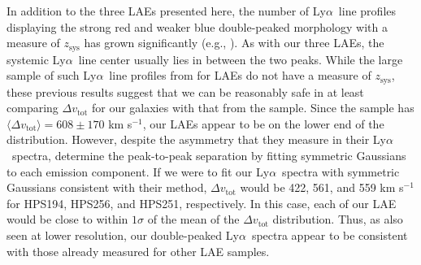 \documentclass{emulateapj}
\newcommand{\lya}{Ly$\alpha$}
\begin{document}
In addition to the three LAEs presented here, the number of \lya\ line profiles displaying the strong red and weaker blue double-peaked morphology with a measure of $z_{\mathrm{sys}}$ has grown significantly (e.g., \citealp{fynbo2010,steidel2010,mclinden2011,yang2011,heckman2011,kulas2012,christensen2012,noterdaeme2012}). As with our three LAEs, the systemic \lya\ line center usually lies in between the two peaks. While the large sample of such \lya\ line profiles from \citet{yamada2012} for LAEs do not have a measure of $z_{\mathrm{sys}}$, these previous results suggest that we can be reasonably safe in at least comparing $\Delta v_{\mathrm{tot}}$ for our galaxies with that from the \citet{yamada2012} sample. Since the \citet{yamada2012} sample has $\langle\Delta v_{\mathrm{tot}}\rangle = 608\pm170$ km s$^{-1}$, our LAEs appear to be on the lower end of the distribution. However, despite the asymmetry that they measure in their \lya\ spectra, \citet{yamada2012} determine the peak-to-peak separation by fitting symmetric Gaussians to each emission component. If we were to fit our \lya\ spectra with symmetric Gaussians consistent with their method, $\Delta v_{\mathrm{tot}}$ would be 422, 561, and 559 km s$^{-1}$ for HPS194, HPS256, and HPS251, respectively. In this case, each of our LAE would be close to within $1\sigma$ of the mean of the \citet{yamada2012} $\Delta v_{\mathrm{tot}}$ distribution. Thus, as also seen at lower resolution, our double-peaked \lya\ spectra appear to be consistent with those already measured for other LAE samples.
\end{document}
